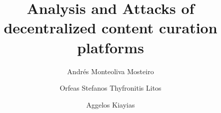 \title{Analysis and Attacks of decentralized content curation platforms}
\author{Andr\'es Monteoliva Mosteiro \and Orfeas Stefanos Thyfronitis Litos \and
Aggelos Kiayias}
\maketitle

